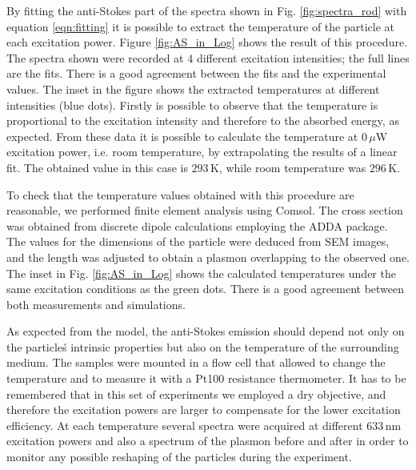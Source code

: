 \documentclass[journal=nalefd,manuscript=letter]{achemso}
\newcommand{\K}{\ensuremath{\,\textrm{K}}}
\newcommand{\nm}{\ensuremath{\,\textrm{nm}}}
\newcommand{\uW}{\ensuremath{\,\mu\textrm{W}}}
\begin{document}
By fitting the anti-Stokes part of the spectra shown in Fig.
\ref{fig:spectra_rod} with equation \ref{eqn:fitting} it is possible to extract
the temperature of the particle at each excitation power. Figure
\ref{fig:AS_in_Log} shows the result of this procedure. The spectra shown were
recorded at $4$ different excitation intensities; the full lines are the fits.
There is a good agreement between the fits and the experimental values. The
inset in the figure shows the extracted temperatures at different intensities
(blue dots). Firstly is possible to observe that the temperature is proportional
to the excitation intensity and therefore to the absorbed energy, as expected.
From these data it is possible to calculate the temperature at $0\uW$ excitation
power, i.e. room temperature, by extrapolating the results of a linear fit. The
obtained value in this case is $293\K$, while room temperature was $296\K$.

To check that the temperature values obtained with this procedure are
reasonable, we performed finite element analysis using Comsol. The cross section
was obtained from discrete dipole calculations employing the ADDA
package\cite{Yurkin2011}. The values for the dimensions of the particle were
deduced from SEM images, and the length was adjusted to obtain a plasmon
overlapping to the observed one. The inset in Fig. \ref{fig:AS_in_Log} shows the
calculated temperatures under the same excitation conditions as the green dots.
There is a good agreement between both measurements and simulations. 


As expected from the model, the anti-Stokes emission should depend not only on
the particle\'s intrinsic properties but also on the temperature of the
surrounding medium\cite{Konrad2013}. The samples were mounted in a flow cell
that allowed to change the temperature and to measure it with a Pt100 resistance
thermometer. It has to be remembered that in this set of experiments we
employed a dry objective, and therefore the excitation powers are larger to compensate for the
lower excitation efficiency. At each temperature several spectra were acquired
at different $633\nm$ excitation powers and also a spectrum of the plasmon
before and after in order to monitor any possible reshaping of the particles
during the experiment.
\end{document}
